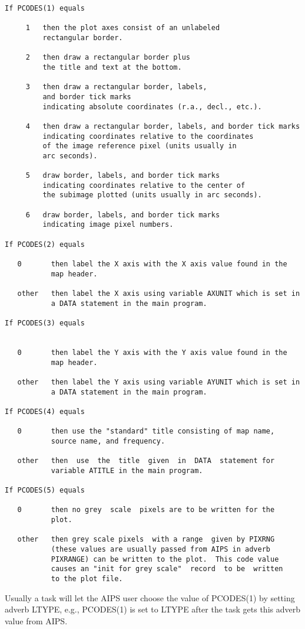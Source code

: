 \begin{verbatim}
If PCODES(1) equals

     1   then the plot axes consist of an unlabeled
         rectangular border.

     2   then draw a rectangular border plus
         the title and text at the bottom.

     3   then draw a rectangular border, labels,
         and border tick marks
         indicating absolute coordinates (r.a., decl., etc.).

     4   then draw a rectangular border, labels, and border tick marks
         indicating coordinates relative to the coordinates
         of the image reference pixel (units usually in
         arc seconds).

     5   draw border, labels, and border tick marks
         indicating coordinates relative to the center of
         the subimage plotted (units usually in arc seconds).

     6   draw border, labels, and border tick marks
         indicating image pixel numbers.

If PCODES(2) equals

   0       then label the X axis with the X axis value found in the
           map header.

   other   then label the X axis using variable AXUNIT which is set in
           a DATA statement in the main program.

If PCODES(3) equals


   0       then label the Y axis with the Y axis value found in the
           map header.

   other   then label the Y axis using variable AYUNIT which is set in
           a DATA statement in the main program.

If PCODES(4) equals

   0       then use the "standard" title consisting of map name,
           source name, and frequency.

   other   then  use  the  title  given  in  DATA  statement for
           variable ATITLE in the main program.

If PCODES(5) equals

   0       then no grey  scale  pixels are to be written for the
           plot.

   other   then grey scale pixels  with a range  given by PIXRNG
           (these values are usually passed from AIPS in adverb
           PIXRANGE) can be written to the plot.  This code value
           causes an "init for grey scale"  record  to be  written
           to the plot file.

\end{verbatim}
Usually a task will let the AIPS user choose the value of PCODES(1) by
setting adverb LTYPE, e.g., PCODES(1) is set to LTYPE after the task
gets this adverb value from AIPS.

